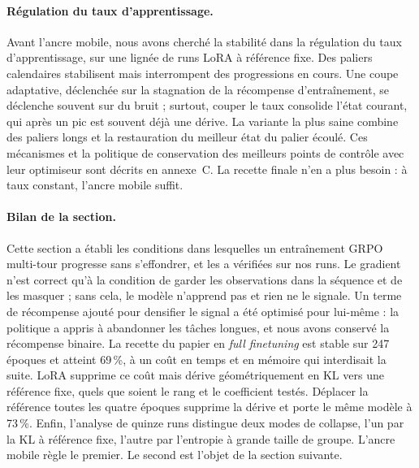 \documentclass[11pt,a4paper]{article}
\begin{document}
\paragraph{Régulation du taux d'apprentissage.} Avant l'ancre mobile, nous avons cherché la stabilité dans la régulation du taux d'apprentissage, sur une lignée de runs LoRA à référence fixe. Des paliers calendaires stabilisent mais interrompent des progressions en cours. Une coupe adaptative, déclenchée sur la stagnation de la récompense d'entraînement, se déclenche souvent sur du bruit ; surtout, couper le taux consolide l'état courant, qui après un pic est souvent déjà une dérive. La variante la plus saine combine des paliers longs et la restauration du meilleur état du palier écoulé. Ces mécanismes et la politique de conservation des meilleurs points de contrôle avec leur optimiseur sont décrits en annexe~C. La recette finale n'en a plus besoin : à taux constant, l'ancre mobile suffit.

\paragraph{Bilan de la section.} Cette section a établi les conditions dans lesquelles un entraînement GRPO multi-tour progresse sans s'effondrer, et les a vérifiées sur nos runs. Le gradient n'est correct qu'à la condition de garder les observations dans la séquence et de les masquer ; sans cela, le modèle n'apprend pas et rien ne le signale. Un terme de récompense ajouté pour densifier le signal a été optimisé pour lui-même : la politique a appris à abandonner les tâches longues, et nous avons conservé la récompense binaire. La recette du papier en \emph{full finetuning} est stable sur 247 époques et atteint 69\,\%, à un coût en temps et en mémoire qui interdisait la suite. LoRA supprime ce coût mais dérive géométriquement en KL vers une référence fixe, quels que soient le rang et le coefficient testés. Déplacer la référence toutes les quatre époques supprime la dérive et porte le même modèle à 73\,\%. Enfin, l'analyse de quinze runs distingue deux modes de collapse, l'un par la KL à référence fixe, l'autre par l'entropie à grande taille de groupe. L'ancre mobile règle le premier. Le second est l'objet de la section suivante.
\end{document}
